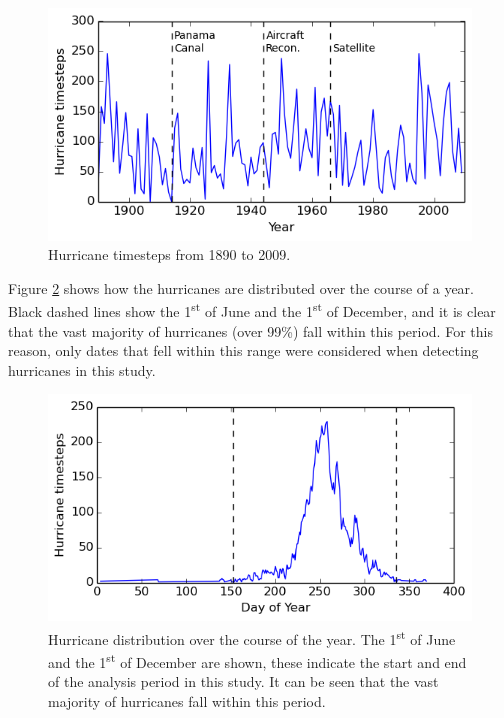 \documentclass[pdftex,12pt,a4paper]{report}
\newcommand{\ts}{\textsuperscript}
\begin{document}
\begin{figure}[hb!]
    \centering
    \includegraphics[width=\textwidth]{figures/hurr_per_year}
    \caption{Hurricane timesteps from 1890 to 2009.}
    \label{fig:hurr_per_year}
\end{figure}

\newpage
Figure \ref{fig:yearly_hurr_dist} shows how the hurricanes are distributed over the course of a
year. Black dashed lines show the 1\ts{st} of June and the 1\ts{st} of December, and it is clear
that the vast majority of hurricanes (over 99\%) fall within this period. For this reason, only
dates that fell within this range were considered when detecting hurricanes in this study.

\begin{figure}[hb!]
    \centering
    \includegraphics[width=\textwidth]{figures/yearly_hurr_dist}
    \caption{Hurricane distribution over the course of the year. The 1\ts{st} of June and the
    1\ts{st} of December are shown, these indicate the start and end of the analysis period in this
study. It can be seen that the vast majority of hurricanes fall within this period.}
    \label{fig:yearly_hurr_dist}
\end{figure}
\end{document}

